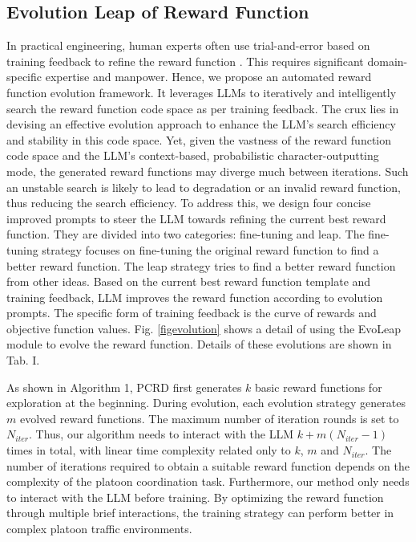 \documentclass[lettersize,journal]{IEEEtran}
\begin{document}
\subsection{Evolution Leap of Reward Function}
In practical engineering, human experts often use trial-and-error based on training feedback to refine the reward function \cite{booth2023perils}. 
This requires significant domain-specific expertise and manpower.
Hence, we propose an automated reward function evolution framework. 
It leverages LLMs to iteratively and intelligently search the reward function code space as per training feedback. 
The crux lies in devising an effective evolution approach to enhance the LLM's search efficiency and stability in this code space. 
Yet, given the vastness of the reward function code space and the LLM's context-based, probabilistic character-outputting mode, the generated reward functions may diverge much between iterations. 
Such an unstable search is likely to lead to degradation or an invalid reward function, thus reducing the search efficiency.
To address this, we design four concise improved prompts to steer the LLM towards refining the current best reward function.
They are divided into two categories: fine-tuning and leap. The fine-tuning strategy focuses on fine-tuning the original reward function to find a better reward function. The leap strategy tries to find a better reward function from other ideas.
Based on the current best reward function template and training feedback, LLM improves the reward function according to evolution prompts.
The specific form of training feedback is the curve of rewards and objective function values.
Fig. \ref{figevolution} shows a detail of using the EvoLeap module to evolve the reward function.
Details of these evolutions are shown in Tab. I.







As shown in Algorithm 1, PCRD first generates $k$ basic reward functions for exploration at the beginning. 
During evolution, each evolution strategy generates $m$ evolved reward functions. 
The maximum number of iteration rounds is set to $N_{iter}$. 
Thus, our algorithm needs to interact with the LLM $k + m(N_{iter}-1)$ times in total, with linear time complexity related only to $k$, $m$ and $N_{iter}$.
The number of iterations required to obtain a suitable reward function depends on the complexity of the platoon coordination task.
Furthermore, our method only needs to interact with the LLM before training. 
By optimizing the reward function through multiple brief interactions, the training strategy can perform better in complex platoon traffic environments.
\end{document}
